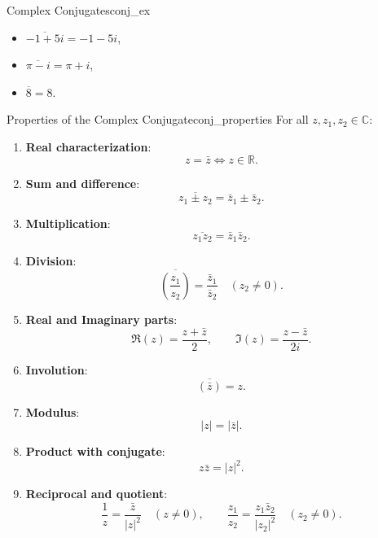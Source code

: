 \begin{example}{Complex Conjugates}{conj_ex}
\begin{itemize}
    \item $\overline{-1 + 5i} = -1 - 5i$,
    \item $\overline{\pi - i} = \pi + i$,
    \item $\overline{8} = 8$.
\end{itemize}
\end{example}

\begin{proposition}{Properties of the Complex Conjugate}{conj_properties}
For all $z, z_1, z_2 \in \mathbb{C}$:
\begin{enumerate}
    \item \textbf{Real characterization}:
    \begin{equation}
    z = \bar{z} \iff z \in \mathbb{R}.
    \end{equation}
    \item \textbf{Sum and difference}:
    \begin{equation}
    \overline{z_1 \pm z_2} = \bar{z}_1 \pm \bar{z}_2.
    \end{equation}
    \item \textbf{Multiplication}:
    \begin{equation}
    \overline{z_1 z_2} = \bar{z}_1 \bar{z}_2.
    \end{equation}
    \item \textbf{Division}:
    \begin{equation}
    \overline{\left(\frac{z_1}{z_2}\right)} = \frac{\bar{z}_1}{\bar{z}_2} \quad (z_2 \neq 0).
    \end{equation}
    \item \textbf{Real and Imaginary parts}:
    \begin{equation}
    \Re(z) = \frac{z + \bar{z}}{2}, \qquad \Im(z) = \frac{z - \bar{z}}{2i}.
    \end{equation}
    \item \textbf{Involution}:
    \begin{equation}
    \overline{(\bar{z})} = z.
    \end{equation}
    \item \textbf{Modulus}:
    \begin{equation}
    |z| = |\bar{z}|.
    \end{equation}
    \item \textbf{Product with conjugate}:
    \begin{equation}
    z\bar{z} = |z|^2.
    \end{equation}
    \item \textbf{Reciprocal and quotient}:
    \begin{equation}
    \frac{1}{z} = \frac{\bar{z}}{|z|^2} \quad (z \neq 0), \qquad \frac{z_1}{z_2} = \frac{z_1 \bar{z}_2}{|z_2|^2} \quad (z_2 \neq 0).
    \end{equation}
\end{enumerate}
\end{proposition}


